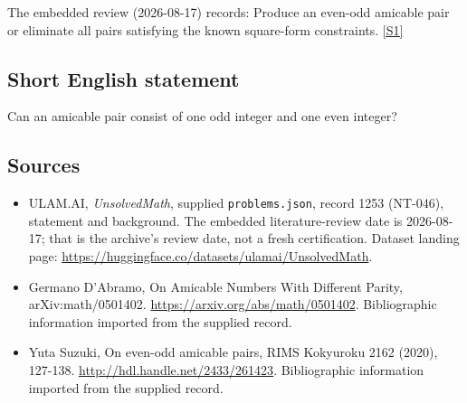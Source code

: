 \documentclass[11pt,a4paper]{article}
\newcommand{\sref}[2]{\hyperlink{source:#1:#2}{[S#2]}}
\begin{document}
The embedded review (2026-08-17) records: Produce an even-odd amicable pair or eliminate all pairs satisfying the known square-form constraints. \sref{1253}{1}

\subsection{Short English statement}

Can an amicable pair consist of one odd integer and one even integer?

\subsection{Sources}

{\small

\begin{itemize}

\item[\hypertarget{source:1253:1}{S1}] ULAM.AI, \emph{UnsolvedMath}, supplied \texttt{problems.json}, record 1253 (NT-046), statement and background. The embedded literature-review date is 2026-08-17; that is the archive’s review date, not a fresh certification. Dataset landing page: \url{https://huggingface.co/datasets/ulamai/UnsolvedMath}.

\item[\hypertarget{source:1253:2}{S2}] Germano D'Abramo, On Amicable Numbers With Different Parity, arXiv:math/0501402. \url{https://arxiv.org/abs/math/0501402}. Bibliographic information imported from the supplied record.

\item[\hypertarget{source:1253:3}{S3}] Yuta Suzuki, On even-odd amicable pairs, RIMS Kokyuroku 2162 (2020), 127-138. \url{http://hdl.handle.net/2433/261423}. Bibliographic information imported from the supplied record.

\end{itemize}

}

\label{end:1253}
\end{document}

